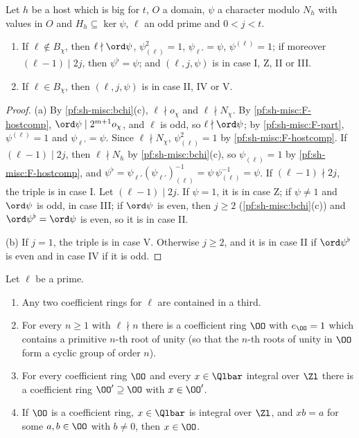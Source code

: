 \begin{proposition}\label{pf:sh-misc:cases}
Let $h$ be a host which is big for $t$, $O$ a domain, $\psi$ a character modulo $N_h$ with values in $O$ and $H_h\subseteq\ker\psi$,
$\ell$ an odd prime and $0<j<t$.
\begin{enumerate}[label=(\alph*)]
\item If $\ell\notin B_\chi$, then $\ell\nmid\ord\psi$, $\psi_{(\ell)}^2=1$, $\psi_{\ell'}=\psi$, $\psi^{(\ell)}=1$; if moreover $(\ell-1)\mid2j$, then
$\psi^\flat=\psi$; and $(\ell,j,\psi)$ is in case I, Z, II or III.
\item If $\ell\in B_\chi$, then $(\ell,j,\psi)$ is in case II, IV or V.
\end{enumerate}
\end{proposition}

\begin{proof}
(a) By \cref{pf:sh-misc:bchi}(c), $\ell\nmid o_\chi$ and $\ell\nmid N_\chi$. By \ref{pf:sh-misc:F-hostcomp}, $\ord\psi\mid2^{m+1}o_\chi$, and
$\ell$ is odd, so $\ell\nmid\ord\psi$; by \ref{pf:sh-misc:F-part}, $\psi^{(\ell)}=1$ and $\psi_{\ell'}=\psi$. Since $\ell\nmid N_\chi$,
$\psi_{(\ell)}^2=1$ by \ref{pf:sh-misc:F-hostcomp}. If $(\ell-1)\mid2j$, then $\ell\nmid N_h$ by \cref{pf:sh-misc:bchi}(c), so
$\psi_{(\ell)}=1$ by \ref{pf:sh-misc:F-hostcomp}, and $\psi^\flat=\psi_{\ell'}(\psi_{\ell'})_{(\ell)}^{-1}=\psi\,\psi_{(\ell)}^{-1}=\psi$.
If $(\ell-1)\nmid2j$, the triple is in case I. Let $(\ell-1)\mid2j$. If $\psi=1$, it is in case Z; if $\psi\ne1$ and $\ord\psi$ is odd, in case
III; if $\ord\psi$ is even, then $j\ge2$ (\cref{pf:sh-misc:bchi}(c)) and $\ord\psi^\flat=\ord\psi$ is even, so it is in case II.

(b) If $j=1$, the triple is in case V. Otherwise $j\ge2$, and it is in case II if $\ord\psi^\flat$ is even and in case IV if it is odd.
\end{proof}

\begin{lemma}\label{pf:sh-misc:coefsup}
Let $\ell$ be a prime.
\begin{enumerate}[label=(\alph*)]
\item Any two coefficient rings for $\ell$ are contained in a third.
\item For every $n\ge1$ with $\ell\nmid n$ there is a coefficient ring $\OO$ with $e_\OO=1$ which contains a primitive $n$-th root of unity
(so that the $n$-th roots of unity in $\OO$ form a cyclic group of order $n$).
\item For every coefficient ring $\OO$ and every $x\in\Qlbar$ integral over $\Zl$ there is a coefficient ring $\OO'\supseteq\OO$ with
$x\in\OO'$.
\item If $\OO$ is a coefficient ring, $x\in\Qlbar$ is integral over $\Zl$, and $xb=a$ for some $a,b\in\OO$ with $b\ne0$, then $x\in\OO$.
\end{enumerate}
\end{lemma}

